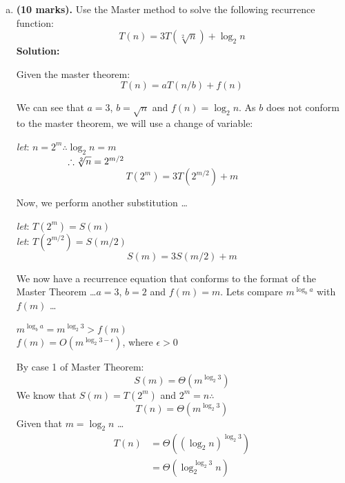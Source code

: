 \begin{homeworkProblem}
\begin{enumerate}[a)]
	\item \textbf{(10 marks).} Use the Master method to solve the following 
    recurrence function:
    	\begin{equation}
			T(n) = 3T(\sqrt[2]{n}) + \log_2 n
		\end{equation}
	\textbf{Solution:}
    \par
    Given the master theorem:
    \begin{equation}
		T(n) = aT(n/b) + f(n)
	\end{equation}
    \par 
    We can see that $a = 3$, $b = \sqrt{n}$ and $f(n) = \log_2 n$. As $b$ does not 
    conform to the master theorem, we will use a change of variable:
    \par 
    
    \textit{let}: $n = 2^{m} \therefore \log_2 n = m$ \\
    $\hspace*{1.87cm} \therefore \sqrt[2]{n} = 2^{m/2}$
    \begin{equation}
		T(2^{m}) = 3T(2^{m/2}) + m
	\end{equation}
    \par 
    Now, we perform another substitution \ldots
    \par
    \textit{let}: $T(2^{m}) = S(m)$\\
    \textit{let}: $T(2^{m/2}) = S(m/2)$
    \begin{equation}
		S(m) = 3S(m/2) + m
	\end{equation}
    \par 
    We now have a recurrence equation that conforms to the format of the Master 
    Theorem \ldots $a = 3$, $b = 2$ and $f(m) = m$. Lets compare $m^{\log_b a}$ with 
    $f(m)$ \ldots
    \par 
    $m^{\log_b a} = m^{\log_2 3} > f(m)$\\
    $f(m) = O(m^{\log_2 3 - \epsilon})$, where $\epsilon > 0$
    \par 
    By case 1 of Master Theorem:
    \begin{equation}
		S(m) = \Theta(m^{\log_2 3})
	\end{equation}
    We know that $S(m) = T(2^m)$ and $2^m = n \therefore$
    \begin{equation}
		T(n) = \Theta(m^{\log_2 3})
	\end{equation}
    Given that $m = \log_2 n$ \ldots
    \begin{equation}
    \begin{aligned}
		T(n) &= \Theta((\log_2 n)^{\log_2 3})\\
        &= \Theta(\log_2^{\log_2 3} n)
	\end{aligned}
	\end{equation}
    
    
\end{enumerate}
\end{homeworkProblem}

